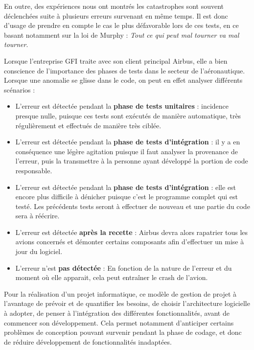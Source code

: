 En outre, des expériences nous ont montrés les catastrophes sont souvent déclenchées suite à plusieurs erreurs survenant en même temps. Il est donc d'usage de prendre en compte le cas le plus défavorable lors de ces tests, en ce basant notamment sur la loi de Murphy : \textit{Tout ce qui peut mal tourner va mal tourner}.

\begin{app} \label{rxp_tests}
Lorsque l'entreprise GFI traite avec son client principal Airbus, elle a bien conscience de l'importance des phases de tests dans le secteur de l'aéronautique. Lorsque une anomalie se glisse dans le code, on peut en effet analyser différents scénarios :
\begin{itemize}
\item L'erreur est détectée pendant la \textbf{phase de tests unitaires} : incidence presque nulle, puisque ces tests sont exécutés de manière automatique, très régulièrement et effectués de manière très ciblée.
\item L'erreur est détectée pendant la \textbf{phase de tests d'intégration} : il y a en conséquence une légère agitation puisque il faut analyser la provenance de l'erreur, puis la transmettre à la personne ayant développé la portion de code responsable.
\item L'erreur est détectée pendant la \textbf{phase de tests d'intégration} : elle est encore plus difficile à dénicher puisque c'est le programme complet qui est testé. Les précédents tests seront à effectuer de nouveau et une partie du code sera à réécrire.
\item L'erreur est détectée \textbf{après la recette} : Airbus devra alors rapatrier tous les avions concernés et démonter certains composants afin d'effectuer un mise à jour du logiciel.
\item L'erreur n'est \textbf{pas détectée} : En fonction de la nature de l'erreur et du moment où elle apparait, cela peut entraîner le crash de l'avion.
\end{itemize}
\end{app}

Pour la réalisation d'un projet informatique, ce modèle de gestion de projet à l'avantage de prévoir et de quantifier les besoins, de choisir l'architecture logicielle à adopter, de penser à l'intégration des différentes fonctionnalités, avant de commencer son développement. Cela permet notamment d'anticiper certains problèmes de conception pouvant survenir pendant la phase de codage, et donc de réduire développement de fonctionnalités inadaptées.

